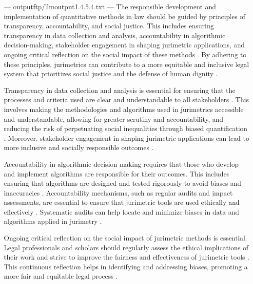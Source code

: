 ---
outputftp/llmoutput1.4.5.4.txt
---
The responsible development and implementation of quantitative methods in law should be guided by principles of transparency, accountability, and social justice. This includes ensuring transparency in data collection and analysis, accountability in algorithmic decision-making, stakeholder engagement in shaping jurimetric applications, and ongoing critical reflection on the social impact of these methods \cite{10.1590/dados.2022.65.3.267,1023071190721}. By adhering to these principles, jurimetrics can contribute to a more equitable and inclusive legal system that prioritizes social justice and the defense of human dignity \cite{10.1590/dados.2022.65.3.267,1023071190721}.

Transparency in data collection and analysis is essential for ensuring that the processes and criteria used are clear and understandable to all stakeholders \cite{10.1590/dados.2022.65.3.267,10.1057/s41599-020-00557-0}. This involves making the methodologies and algorithms used in jurimetrics accessible and understandable, allowing for greater scrutiny and accountability, and reducing the risk of perpetuating social inequalities through biased quantification \cite{10.1590/dados.2022.65.3.267,10.1057/s41599-020-0396-5}. Moreover, stakeholder engagement in shaping jurimetric applications can lead to more inclusive and socially responsible outcomes \cite{10.1590/dados.2022.65.3.267,10.1057/s41599-020-0396-5}.

Accountability in algorithmic decision-making requires that those who develop and implement algorithms are responsible for their outcomes. This includes ensuring that algorithms are designed and tested rigorously to avoid biases and inaccuracies \cite{10.1007/s11186-021-09453-1,1023071190721}. Accountability mechanisms, such as regular audits and impact assessments, are essential to ensure that jurimetric tools are used ethically and effectively \cite{10.1007/s11186-021-09453-1,1023071190721}. Systematic audits can help locate and minimize biases in data and algorithms applied in jurimetry \cite{10.1590/dados.2022.65.3.267,inthelawviewmetadatacitationsimilarpapers2014}.

Ongoing critical reflection on the social impact of jurimetric methods is essential. Legal professionals and scholars should regularly assess the ethical implications of their work and strive to improve the fairness and effectiveness of jurimetric tools \cite{unger2021process}. This continuous reflection helps in identifying and addressing biases, promoting a more fair and equitable legal process \cite{10.1007/s11186-021-09453-1,1023071190721}.

